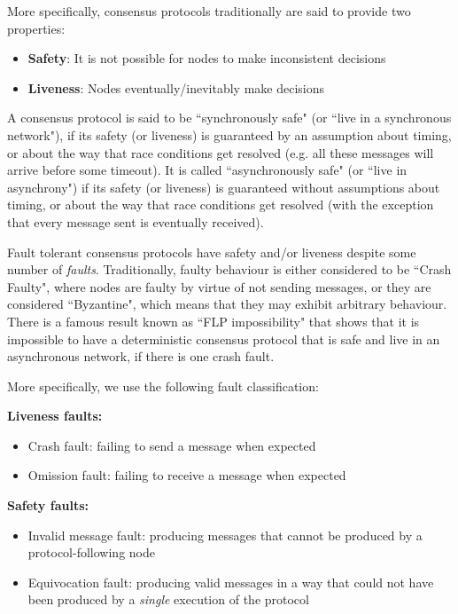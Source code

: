 \documentclass{article}
\theoremstyle{definition}
\begin{document}
More specifically, consensus protocols traditionally are said to provide two properties:
\begin{itemize}
\item \textbf{Safety}: It is not possible for nodes to make inconsistent decisions
\item \textbf{Liveness}: Nodes eventually/inevitably make decisions
\end{itemize}

A consensus protocol is said to be ``synchronously safe" (or ``live in a synchronous network"), if its safety (or liveness) is guaranteed by an assumption about timing, or about the way that race conditions get resolved (e.g. all these messages will arrive before some timeout). It is called ``asynchronously safe" (or ``live in asynchrony") if its safety (or liveness) is guaranteed without assumptions about timing, or about the way that race conditions get resolved (with the exception that every message sent is eventually received).

Fault tolerant consensus protocols have safety and/or liveness despite some number of \emph{faults}. Traditionally, faulty behaviour is either considered to be ``Crash Faulty", where nodes are faulty by virtue of not sending messages, or they are considered ``Byzantine", which means that they may exhibit arbitrary behaviour. There is a famous result known as ``FLP impossibility" \cite{Fischer_Lynch_Paterson_FLP_Impossibility_1985} that shows that it is impossible to have a deterministic consensus protocol that is safe and live in an asynchronous network, if there is one crash fault.

More specifically, we use the following fault classification:

\textbf{Liveness faults:}
\begin{itemize}
\item Crash fault: failing to send a message when expected
\item Omission fault: failing to receive a message when expected
\end{itemize}
\textbf{Safety faults:}
\begin{itemize}
\item Invalid message fault: producing messages that cannot be produced by a protocol-following node
\item Equivocation fault: producing valid messages in a way that could not have been produced by a \emph{single} execution of the protocol
\end{itemize}
\end{document}
